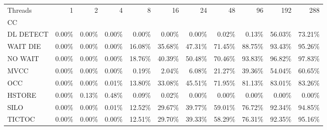 \begin{tabular}{lrrrrrrrrrr}
\toprule
Threads &   1   &   2   &   4   &    8   &    16  &    24  &    48  &    96  &    192 &    288 \\
CC        &       &       &       &        &        &        &        &        &        &        \\
\midrule
DL DETECT & 0.00\% & 0.00\% & 0.00\% &  0.00\% &  0.00\% &  0.00\% &  0.02\% &  0.13\% & 56.03\% & 73.21\% \\
WAIT DIE  & 0.00\% & 0.00\% & 0.00\% & 16.08\% & 35.68\% & 47.31\% & 71.45\% & 88.75\% & 93.43\% & 95.26\% \\
NO WAIT   & 0.00\% & 0.00\% & 0.00\% & 18.76\% & 40.39\% & 50.48\% & 70.46\% & 93.83\% & 96.82\% & 97.83\% \\
MVCC      & 0.00\% & 0.00\% & 0.00\% &  0.19\% &  2.04\% &  6.08\% & 21.27\% & 39.36\% & 54.04\% & 60.65\% \\
OCC       & 0.00\% & 0.00\% & 0.01\% & 13.80\% & 33.08\% & 45.51\% & 71.95\% & 81.13\% & 83.01\% & 83.26\% \\
HSTORE    & 0.00\% & 0.13\% & 0.48\% &  0.09\% &  0.02\% &  0.00\% &  0.00\% &  0.00\% &  0.00\% &  0.00\% \\
SILO      & 0.00\% & 0.00\% & 0.01\% & 12.52\% & 29.67\% & 39.77\% & 59.01\% & 76.72\% & 92.34\% & 94.85\% \\
TICTOC    & 0.00\% & 0.00\% & 0.00\% & 12.51\% & 29.70\% & 39.33\% & 58.29\% & 76.31\% & 92.35\% & 95.16\% \\
\bottomrule
\end{tabular}
